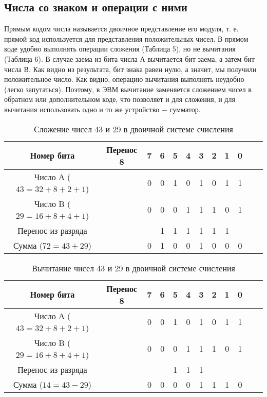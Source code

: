 \documentclass[a4paper]{article}
\begin{document}
\subsection{Числа со знаком и операции с ними}
Прямым кодом числа называется двоичное представление его модуля, т. е. прямой код используется для представления положительных чисел. В прямом коде удобно выполнять операции сложения (Таблица 5), но не вычитания (Таблица 6). В случае заема из бита числа А вычитается бит заема, а затем бит числа В. Как видно из результата, бит знака равен нулю, а значит, мы получили положительное число. Как видно, операцию вычитания выполнять неудобно (легко запутаться). Поэтому, в ЭВМ вычитание заменяется сложением чисел в обратном или дополнительном коде, что позволяет и для сложения, и для вычитания использовать одно и то же устройство $-$ сумматор.
\begin{table}\label{table:add}
      \caption{Сложение чисел 43 и 29 в двоичной системе счисления}
      \begin{center}
      \begin{tabular}{c * {11}{c}}
        \toprule
        Номер бита & Перенос 8 & 7 & 6 & 5 & 4 & 3 & 2 & 1 & 0 \\
        \toprule
        Число А ($43 = 32 + 8 + 2 + 1$) &  & 0 & 0 & 1 & 0 & 1 & 0 & 1 & 1\\
        \midrule
        Число B ($29 = 16 + 8 + 4 + 1$) &  & 0 & 0 & 0 & 1 & 1 & 1 & 0 & 1\\
        \midrule
        Перенос из разряда &  &  & 1 & 1 & 1 & 1 & 1 & 1 & \\
        \midrule
        Сумма ($72 = 43 + 29$) &  & 0 & 1 & 0 & 0 & 1 & 0 & 0 & 0 \\
        \bottomrule
      \end{tabular}
    \end{center}
\end{table}
                                    

\begin{table}\label{table:sub}
      \caption{Вычитание  чисел 43 и 29 в двоичной системе счисления}
      \begin{center}
      \begin{tabular}{c * {11} {c}}
        \toprule
        Номер бита & Перенос 8 & 7 & 6 & 5 & 4 & 3 & 2 & 1 & 0 \\
        \toprule
        Число А ($43 = 32 + 8 + 2 + 1$) &  & 0 & 0 & 1 & 0 & 1 & 0 & 1 & 1\\
        \midrule
        Число B ($29 = 16 + 8 + 4 + 1$) &  & 0 & 0 & 0 & 1 & 1 & 1 & 0 & 1\\
        \midrule
        Перенос из разряда &  &  &  & 1 & 1 & 1 &  &  & \\
        \midrule
        Сумма ($14 = 43 - 29$) &  & 0 & 0 & 0 & 0 & 1 & 1 & 1 & 0 \\
        \midrule
      \end{tabular}
      \end{center}
    \end{table}
\end{document}
